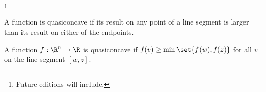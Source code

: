 
  \ifhmode\unskip\fi\footnote{
Future editions will include.
  }


A function is quasiconcave if its result on any point of a line segment is larger than its result on either of the endpoints.


A function $f: \R^n \to \R$ is quasiconcave if $f(v) \geq \min\set{f(w), f(z)}$ for all $v$ on the line segment $[w, z]$.

\blankpage
